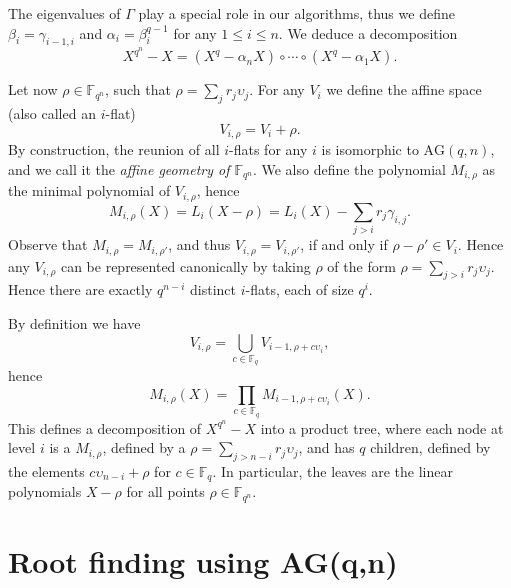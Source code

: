 \documentclass{sig-alternate}
\newcommand{\ff}[1]{\mathbb{F}_{#1}}
\newcommand{\qq}{q}
\newcommand{\nn}{n}
\newcommand{\qn}{{\qq^\nn}}
\newcommand{\basef}{\ff{\qq}}
\newcommand{\extf}{\ff{\qn}}
\newcommand{\AG}{\mathrm{AG}(\qq,\nn)}
\newcounter{algo}
\renewcommand{\paragraph}[1]{\smallskip\noindent{{\bf \rm #1.}}}
\begin{document}
The eigenvalues of $\Gamma$ play a special role in our algorithms,
thus we define $\beta_i=\gamma_{i-1,i}$ and $\alpha_i=\beta_i^{\qq-1}$
for any $1\le i \le \nn$. We deduce a decomposition
\begin{equation}
\label{decomposition_field_eq_gen}
  X^\qn - X = (X^\qq - \alpha_\nn X) \circ \cdots \circ (X^\qq - \alpha_1 X).
\end{equation}

\paragraph{The affine geometry of $\extf$} 
Let now $\rho\in\extf$, such that $\rho=\sum_jr_j\upsilon_j$.  For any
$V_i$ we define the affine space (also called an $i$-flat)
\begin{equation}
  V_{i,\rho} = V_i + \rho.
\end{equation}
By construction, the reunion of all $i$-flats for any $i$ is
isomorphic to $\AG$, and we call it the \emph{affine geometry of
  $\extf$}. We also define the polynomial $M_{i,\rho}$ as the minimal
polynomial of $V_{i,\rho}$, hence
\begin{equation}
  M_{i,\rho}(X) = L_i(X - \rho) = L_i(X) - \sum_{j>i}r_j\gamma_{i,j}.
\end{equation}
Observe that $M_{i,\rho}=M_{i,\rho'}$, and thus
$V_{i,\rho}=V_{i,\rho'}$, if and only if $\rho-\rho'\in V_i$. Hence
any $V_{i,\rho}$ can be represented canonically by taking $\rho$ of
the form $\rho=\sum_{j>i}r_j\upsilon_j$. Hence there are exactly
$\qq^{n-i}$ distinct $i$-flats, each of size $\qq^i$.

By definition we have
\begin{equation}
  V_{i,\rho} = \bigcup_{c\in\basef} V_{i-1,\rho + c\upsilon_i},
\end{equation}
hence
\begin{equation}
\label{node_product}
  M_{i,\rho}(X) = \prod_{c\in\basef} M_{i-1,\rho+c\upsilon_i}(X).
\end{equation}
This defines a decomposition of $X^{\qn}-X$ into a product tree, where
each node at level $i$ is a $M_{i,\rho}$, defined by a
$\rho=\sum_{j>n-i}r_j\upsilon_j$, and has $\qq$ children, defined by
the elements $c\upsilon_{n-i}+\rho$ for $c\in\basef$. In particular,
the leaves are the linear polynomials $X-\rho$ for all points
$\rho\in\extf$.



\section{Root finding using  AG(\qq,\nn)}
\label{sec:arm-sra}
\end{document}
